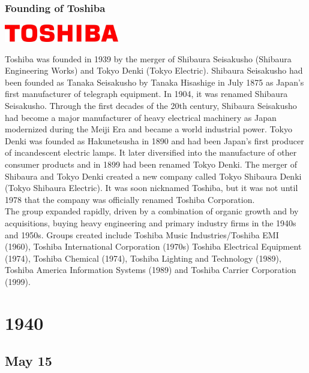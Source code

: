 \documentclass[11pt]{report}
\begin{document}
\subsection{Founding of Toshiba}
\vspace{2mm}\begin{center}\includegraphics[width=5cm]{./img/toshibaLogo.jpg}\end{center}
Toshiba was founded in 1939 by the merger of Shibaura Seisakusho (Shibaura Engineering Works) and Tokyo Denki (Tokyo Electric). Shibaura Seisakusho had been founded as Tanaka Seisakusho by Tanaka Hisashige in July 1875 as Japan's first manufacturer of telegraph equipment. In 1904, it was renamed Shibaura Seisakusho. Through the first decades of the 20th century, Shibaura Seisakusho had become a major manufacturer of heavy electrical machinery as Japan modernized during the Meiji Era and became a world industrial power. Tokyo Denki was founded as Hakunetsusha in 1890 and had been Japan's first producer of incandescent electric lamps. It later diversified into the manufacture of other consumer products and in 1899 had been renamed Tokyo Denki. The merger of Shibaura and Tokyo Denki created a new company called Tokyo Shibaura Denki (Tokyo Shibaura Electric). It was soon nicknamed Toshiba, but it was not until 1978 that the company was officially renamed Toshiba Corporation.\\
\indent The group expanded rapidly, driven by a combination of organic growth and by acquisitions, buying heavy engineering and primary industry firms in the 1940s and 1950s. Groups created include Toshiba Music Industries/Toshiba EMI (1960), Toshiba International Corporation (1970s) Toshiba Electrical Equipment (1974), Toshiba Chemical (1974), Toshiba Lighting and Technology (1989), Toshiba America Information Systems (1989) and Toshiba Carrier Corporation (1999).

\chapter{1940}
\section{May 15}
\end{document}

